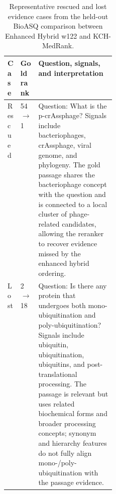 \begin{table}[t]
\centering
\small
\caption{Representative rescued and lost evidence cases from the held-out BioASQ comparison between Enhanced Hybrid w122 and KCH-MedRank.}
\label{tab:case-study}
\begin{tabularx}{\linewidth}{p{0.12\linewidth}p{0.13\linewidth}X}
\toprule
Case & Gold rank & Question, signals, and interpretation \\
\midrule
Rescued & 54 $\rightarrow$ 1 & Question: What is the p-crAssphage? Signals include bacteriophages, crAssphage, viral genome, and phylogeny. The gold passage shares the bacteriophage concept with the question and is connected to a local cluster of phage-related candidates, allowing the reranker to recover evidence missed by the enhanced hybrid ordering. \\
Lost & 2 $\rightarrow$ 18 & Question: Is there any protein that undergoes both mono-ubiquitination and poly-ubiquitination? Signals include ubiquitin, ubiquitination, ubiquitins, and post-translational processing. The passage is relevant but uses related biochemical forms and broader processing concepts; synonym and hierarchy features do not fully align mono-/poly-ubiquitination with the passage evidence. \\
\bottomrule
\end{tabularx}
\end{table}
